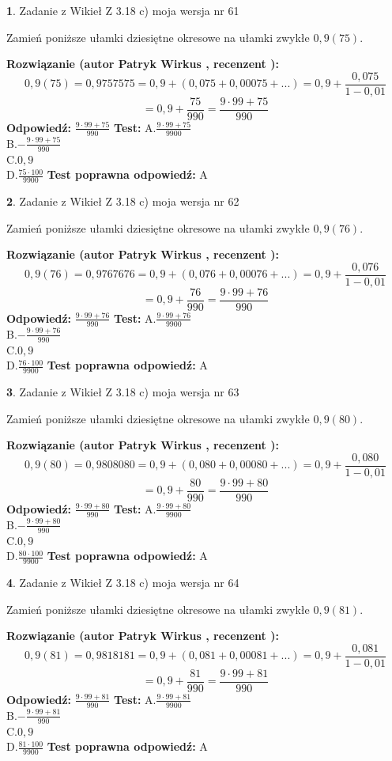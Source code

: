\documentclass[12pt, a4paper]{article}
\theoremstyle{definition} %
\newtheorem{zad}{}
\newcommand{\zadStart}[1]{\begin{zad}#1\newline}
\newcommand{\zadStop}{\end{zad}}
\newcommand{\rozwStart}[2]{\noindent \textbf{Rozwiązanie (autor #1 , recenzent #2): }\newline}
\newcommand{\rozwStop}{\newline}
\newcommand{\odpStart}{\noindent \textbf{Odpowiedź:}\newline}
\newcommand{\odpStop}{\newline}
\newcommand{\testStart}{\noindent \textbf{Test:}\newline}
\newcommand{\testStop}{\newline}
\newcommand{\kluczStart}{\noindent \textbf{Test poprawna odpowiedź:}\newline}
\newcommand{\kluczStop}{\newline}
\begin{document}
\zadStart{Zadanie z Wikieł Z 3.18 c) moja wersja nr 61}

Zamień poniższe ułamki dziesiętne okresowe na ułamki zwykłe $0,9(75)$.
\zadStop
\rozwStart{Patryk Wirkus}{}
$$0,9(75)=0,9757575=0,9+(0,075+0,00075+...)=0,9+\frac{0,075}{1-0,01}$$
$$=0,9+\frac{75}{990}=\frac{9\cdot99+75}{990}$$
\rozwStop
\odpStart
$\frac{9\cdot99+75}{990}$
\odpStop
\testStart
A.$\frac{9\cdot99+75}{9900}$\\ B.$-\frac{9\cdot99+75}{990}$\\ C.$0,9$\\ D.$\frac{75\cdot100}{9900}$
\testStop
\kluczStart
A
\kluczStop



\zadStart{Zadanie z Wikieł Z 3.18 c) moja wersja nr 62}

Zamień poniższe ułamki dziesiętne okresowe na ułamki zwykłe $0,9(76)$.
\zadStop
\rozwStart{Patryk Wirkus}{}
$$0,9(76)=0,9767676=0,9+(0,076+0,00076+...)=0,9+\frac{0,076}{1-0,01}$$
$$=0,9+\frac{76}{990}=\frac{9\cdot99+76}{990}$$
\rozwStop
\odpStart
$\frac{9\cdot99+76}{990}$
\odpStop
\testStart
A.$\frac{9\cdot99+76}{9900}$\\ B.$-\frac{9\cdot99+76}{990}$\\ C.$0,9$\\ D.$\frac{76\cdot100}{9900}$
\testStop
\kluczStart
A
\kluczStop



\zadStart{Zadanie z Wikieł Z 3.18 c) moja wersja nr 63}

Zamień poniższe ułamki dziesiętne okresowe na ułamki zwykłe $0,9(80)$.
\zadStop
\rozwStart{Patryk Wirkus}{}
$$0,9(80)=0,9808080=0,9+(0,080+0,00080+...)=0,9+\frac{0,080}{1-0,01}$$
$$=0,9+\frac{80}{990}=\frac{9\cdot99+80}{990}$$
\rozwStop
\odpStart
$\frac{9\cdot99+80}{990}$
\odpStop
\testStart
A.$\frac{9\cdot99+80}{9900}$\\ B.$-\frac{9\cdot99+80}{990}$\\ C.$0,9$\\ D.$\frac{80\cdot100}{9900}$
\testStop
\kluczStart
A
\kluczStop



\zadStart{Zadanie z Wikieł Z 3.18 c) moja wersja nr 64}

Zamień poniższe ułamki dziesiętne okresowe na ułamki zwykłe $0,9(81)$.
\zadStop
\rozwStart{Patryk Wirkus}{}
$$0,9(81)=0,9818181=0,9+(0,081+0,00081+...)=0,9+\frac{0,081}{1-0,01}$$
$$=0,9+\frac{81}{990}=\frac{9\cdot99+81}{990}$$
\rozwStop
\odpStart
$\frac{9\cdot99+81}{990}$
\odpStop
\testStart
A.$\frac{9\cdot99+81}{9900}$\\ B.$-\frac{9\cdot99+81}{990}$\\ C.$0,9$\\ D.$\frac{81\cdot100}{9900}$
\testStop
\kluczStart
A
\kluczStop
\end{document}
